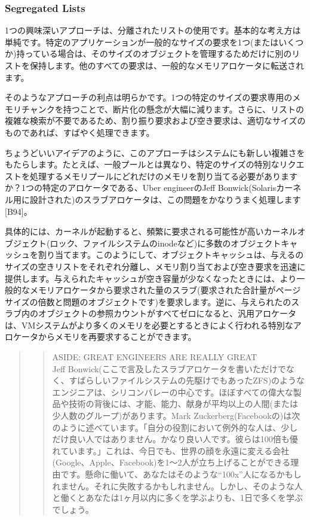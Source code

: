 \hypertarget{segregated-lists}{%
\subsubsection*{Segregated Lists}\label{segregated-lists}}

1つの興味深いアプローチは、分離されたリストの使用です。基本的な考え方は単純です。特定のアプリケーションが一般的なサイズの要求を1つ(またはいくつか)持っている場合は、そのサイズのオブジェクトを管理するためだけに別のリストを保持します。他のすべての要求は、一般的なメモリアロケータに転送されます。

そのようなアプローチの利点は明らかです。1つの特定のサイズの要求専用のメモリチャンクを持つことで、断片化の懸念が大幅に減ります。さらに、リストの複雑な検索が不要であるため、割り振り要求および空き要求は、適切なサイズのものであれば、すばやく処理できます。

ちょうどいいアイデアのように、このアプローチはシステムにも新しい複雑さをもたらします。たとえば、一般プールとは異なり、特定のサイズの特別なリクエストを処理するメモリプールにどれだけのメモリを割り当てる必要がありますか？1つの特定のアロケータである、Uber
engineerのJeff
Bonwick(Solarisカーネル用に設計された)のスラブアロケータは、この問題をかなりうまく処理します{[}B94{]}。

具体的には、カーネルが起動すると、頻繁に要求される可能性が高いカーネルオブジェクト(ロック、ファイルシステムのinodeなど)に多数のオブジェクトキャッシュを割り当てます。このようにして、オブジェクトキャッシュは、与えるのサイズの空きリストをそれぞれ分離し、メモリ割り当ておよび空き要求を迅速に提供します。与えられたキャッシュが空き容量が少なくなったときには、より一般的なメモリアロケータから要求された量のスラブ(要求された合計量がページサイズの倍数と問題のオブジェクトです)を要求します。逆に、与えられたのスラブ内のオブジェクトの参照カウントがすべてゼロになると、汎用アロケータは、VMシステムがより多くのメモリを必要とするときによく行われる特別なアロケータからメモリを再要求することができます。

\begin{quote}
\begin{quote}
ASIDE: GREAT ENGINEERS ARE REALLY GREAT\\
Jeff
Bonwick(ここで言及したスラブアロケータを書いただけでなく、すばらしいファイルシステムの先駆けでもあったZFS)のようなエンジニアは、シリコンバレーの中心です。ほぼすべての偉大な製品や技術の背後には、才能、能力、献身が平均以上の人間(または少人数のグループ)があります。Mark
Zuckerberg(Facebookの)は次のように述べています。「自分の役割において例外的な人は、少しだけ良い人ではありません。かなり良い人です。彼らは100倍も優れています。」これは、今日でも、世界の顔を永遠に変える会社(Google、Apple、Facebook)を1〜2人が立ち上げることができる理由です。懸命に働いて、あなたはそのような``100x''人になるかもしれません。それに失敗するかもしれません。しかし、そのような人と働くとあなたは1ヶ月以内に多くを学ぶよりも、1日で多くを学ぶでしょう。
\end{quote}
\end{quote}

